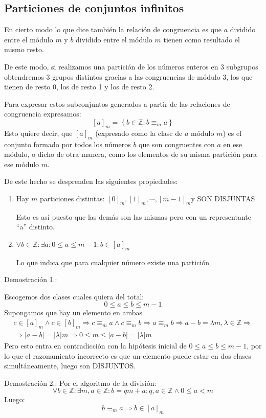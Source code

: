 \documentclass[10pt,a4paper,openright]{book}
\theoremstyle{break}
\begin{document}
\subsection{Particiones de conjuntos infinitos}
En cierto modo lo que dice también la relación de congruencia es que $a$ dividido entre el módulo $m$ y $b$ dividido entre el módulo $m$ tienen como resultado el mismo resto.\par
De este modo, si realizamos una partición de los números enteros en 3 subgrupos obtendremos 3 grupos distintos gracias a las congruencias de módulo 3, los que tienen de resto 0, los de resto 1 y los de resto 2.\par
Para expresar estos subconjuntos generados a partir de las relaciones de congruencia expresamos:
$$[a]_m=\left\lbrace b \in \mathbb Z : b\equiv_m a\right\rbrace$$
Esto quiere decir, que $[a]_m$ (expresado como la clase de $a$ módulo $m$) es el conjunto formado por todos los números $b$ que son congruentes con $a$ en ese módulo, o dicho de otra manera, como los elementos de su misma partición para ese módulo $m$.\par
De este hecho se desprenden las siguientes propiedades:
\begin{enumerate}
\item Hay $m$ particiones distintas: $[0]_m, [1]_m, \cdots, [m-1]_m$y SON DISJUNTAS\par
Esto es así puesto que las demás son las mismas pero con un representante ``a'' distinto.
\item $\forall b\in \mathbb Z : \exists a : 0\leq a\leq m-1: b\in [a]_m$\par
Lo que indica que para cualquier número existe una partición
\end{enumerate}

Demostración 1.:\par
Escogemos dos clases cuales quiera del total:
$$0\leq a\leq b \leq m-1$$
Supongamos que hay un elemento en ambas
\begin{gather*}
c\in [a]_m \wedge c\in [b]_m\Rightarrow c\equiv_m a \wedge c\equiv_m b\Rightarrow a\equiv_m b\Rightarrow a-b=\lambda m, \lambda \in \mathbb Z \Rightarrow \\
\Rightarrow |a-b|=|\lambda|m \Rightarrow 0\leq m\leq |a-b|=|\lambda|m
\end{gather*}
Pero esto entra en contradicción con la hipótesis inicial de $0\leq a\leq b \leq m-1$, por lo que el razonamiento incorrecto es que un elemento puede estar en dos clases simultáneamente, luego son DISJUNTOS.\par
Demostración 2.:
Por el algoritmo de la división:
$$\forall b \in \mathbb Z : \exists m,a \in \mathbb Z : b=qm+a: q,a\in \mathbb Z \wedge 0\leq a<m$$
Luego:
$$b\equiv_m a\Rightarrow b\in [a]_m$$
\end{document}
